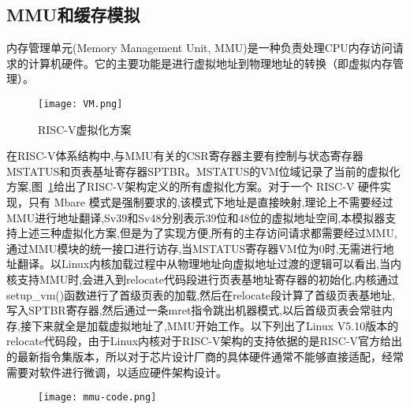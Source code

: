 \subsection{MMU和缓存模拟}

内存管理单元(Memory Management Unit, MMU)是一种负责处理CPU内存访问请求的计算机硬件。它的主要功能是进行虚拟地址到物理地址的转换（即虚拟内存管理）。
\begin{figure}[h]
    \centering
    \texttt{[image: VM.png]}
    \caption{RISC-V虚拟化方案}
    \label{fig:VM}
\end{figure}

在RISC-V体系结构中,与MMU有关的CSR寄存器主要有控制与状态寄存器MSTATUS和页表基址寄存器SPTBR。MSTATUS的VM位域记录了当前的虚拟化方案,图~\ref{fig:VM}给出了RISC-V架构定义的所有虚拟化方案。对于一个 RISC-V 硬件实现，只有 Mbare 模式是强制要求的,该模式下地址是直接映射,理论上不需要经过MMU进行地址翻译,Sv39和Sv48分别表示39位和48位的虚拟地址空间,本模拟器支持上述三种虚拟化方案,但是为了实现方便,所有的主存访问请求都需要经过MMU,通过MMU模块的统一接口进行访存,当MSTATUS寄存器VM位为0时,无需进行地址翻译。以Linux内核加载过程中从物理地址向虚拟地址过渡的逻辑可以看出,当内核支持MMU时,会进入到relocate代码段进行页表基地址寄存器的初始化,内核通过setup\_vm()函数进行了首级页表的加载,然后在relocate段计算了首级页表基地址,写入SPTBR寄存器,然后通过一条mret指令跳出机器模式,以后首级页表会常驻内存,接下来就全是加载虚拟地址了,MMU开始工作。以下列出了Linux V5.10版本的relocate代码段，由于Linux内核对于RISC-V架构的支持依据的是RISC-V官方给出的最新指令集版本，所以对于芯片设计厂商的具体硬件通常不能够直接适配，经常需要对软件进行微调，以适应硬件架构设计。
\begin{figure}[H]
    \centering
    \texttt{[image: mmu-code.png]}
    \label{fig:mmu-code}
\end{figure}
\vspace{-0.8cm} 
